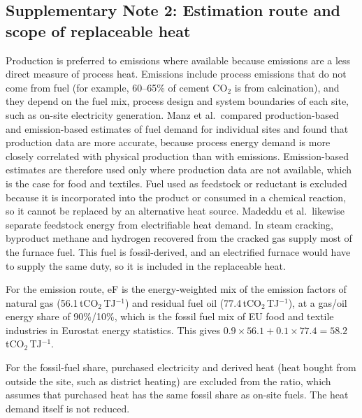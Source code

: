 \documentclass[11pt]{article}
\begin{document}
\subsection*{Supplementary Note 2: Estimation route and scope of replaceable heat}
Production is preferred to emissions where available because emissions are a less direct measure of process heat. Emissions include process emissions that do not come from fuel (for example, 60--65\% of cement CO$_2$ is from calcination), and they depend on the fuel mix, process design and system boundaries of each site, such as on-site electricity generation. Manz et al.\ compared production-based and emission-based estimates of fuel demand for individual sites and found that production data are more accurate, because process energy demand is more closely correlated with physical production than with emissions\cite{manz2018}. Emission-based estimates are therefore used only where production data are not available, which is the case for food and textiles. Fuel used as feedstock or reductant is excluded because it is incorporated into the product or consumed in a chemical reaction, so it cannot be replaced by an alternative heat source. Madeddu et al.\ likewise separate feedstock energy from electrifiable heat demand\cite{madeddu2020}. In steam cracking, byproduct methane and hydrogen recovered from the cracked gas supply most of the furnace fuel\cite{ren2006}. This fuel is fossil-derived, and an electrified furnace would have to supply the same duty, so it is included in the replaceable heat.

For the emission route, eF is the energy-weighted mix of the emission factors of natural gas (56.1\,tCO$_2$\,TJ$^{-1}$) and residual fuel oil (77.4\,tCO$_2$\,TJ$^{-1}$)\cite{ipcc2006stationary}, at a gas/oil energy share of 90\%/10\%, which is the fossil fuel mix of EU food and textile industries in Eurostat energy statistics\cite{eurostat_nrg_d_indq}. This gives $0.9\times56.1+0.1\times77.4=58.2$\,tCO$_2$\,TJ$^{-1}$.

For the fossil-fuel share, purchased electricity and derived heat (heat bought from outside the site, such as district heating) are excluded from the ratio, which assumes that purchased heat has the same fossil share as on-site fuels. The heat demand itself is not reduced.
\end{document}
